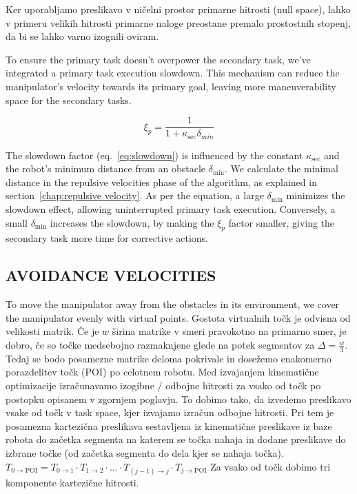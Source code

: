 \documentclass[letterpaper, 10 pt, conference]{ieeeconf}  %
\begin{document}
Ker uporabljamo preslikavo v ničelni prostor primarne hitrosti (null space), lahko v primeru velikih hitrosti primarne naloge preostane premalo prostostnih stopenj, da bi se lahko varno izognili oviram. 

\label{chap:primary slowdown}

To ensure the primary task doesn't overpower the secondary task, we've integrated a primary task execution slowdown. This mechanism can reduce the manipulator's velocity towards its primary goal, leaving more maneuverability space for the secondary tasks.

\begin{equation}
	\label{eq:slowdown}
	\xi_{p}=
	\frac{1}{1 + \kappa_{\text{sec}} \delta_{min}}
\end{equation}

The slowdown factor (eq.~\ref{eq:slowdown}) is influenced by the constant \( \kappa_{\text{sec}} \) and the robot's minimum distance from an obstacle \( \delta_{\text{min}} \). We calculate the minimal distance in the repulsive velocities phase of the algorithm, as explained in section~\ref{chap:repulsive velocity}. As per the equation, a large \( \delta_{\text{min}} \) minimizes the slowdown effect, allowing uninterrupted primary task execution. Conversely, a small \( \delta_{\text{min}} \) increases the slowdown, by making the $\xi_{p}$ factor smaller, giving the secondary task more time for corrective actions.


\subsection{AVOIDANCE VELOCITIES}

To move the manipulator away from the obstacles in its environment, we cover the manipulator evenly with virtual points. Gostota virtualnih točk je odvisna od velikosti matrik. Če je $w$ širina matrike v smeri pravokotno na primarno smer, je dobro, če so točke medsebojno razmaknjene glede na potek segmentov za $\Delta = \frac{w}{3}$. Tedaj se bodo posamezne matrike deloma pokrivale in dosežemo enakomerno porazdelitev točk (POI) po celotnem robotu. Med izvajanjem kinematične optimizacije izračunavamo izogibne / odbojne hitrosti za vsako od točk po postopku opisanem v zgornjem poglavju.  To dobimo tako, da izvedemo preslikavo vsake od točk v task space, kjer izvajamo izračun odbojne hitrosti. Pri tem je posamezna kartezična preslikava sestavljena iz kinematične preslikave iz baze robota do začetka segmenta na katerem se točka nahaja in dodane preslikave do izbrane točke (od začetka segmenta do dela kjer se nahaja točka). \(T_{0 \rightarrow \text{POI}} = T_{0 \rightarrow 1} \cdot T_{1 \rightarrow 2} \cdot \ldots \cdot T_{(j-1) \rightarrow j} \cdot T_{j \rightarrow \text{POI}}\) Za vsako od točk dobimo tri komponente kartezične hitrosti. 
\end{document}
